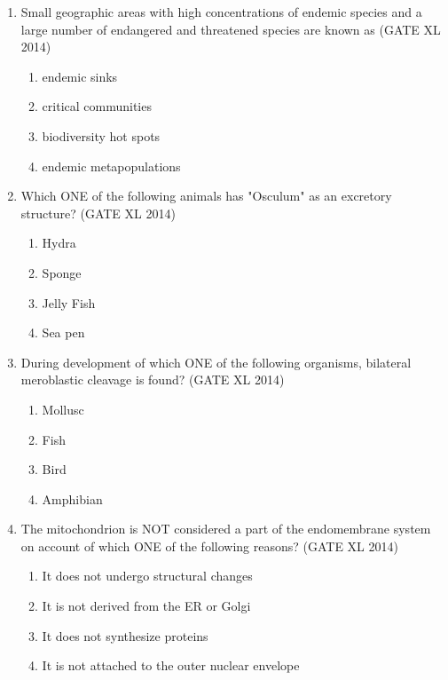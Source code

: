 \documentclass[journal,12pt,onecolumn]{IEEEtran}
\theoremstyle{remark}
\begin{document}
\begin{enumerate}

\item Small geographic areas with high concentrations of endemic species and a large number of endangered and threatened species are known as \hfill(GATE XL 2014)\\
\begin{multicols}{2}
\begin{enumerate}
\item endemic sinks
\item critical communities
\item biodiversity hot spots
\item endemic metapopulations
\end{enumerate}
\end{multicols}

\item Which ONE of the following animals has "Osculum" as an excretory structure? \hfill(GATE XL 2014)\\
\begin{multicols}{2}
\begin{enumerate}
\item Hydra
\item Sponge
\item Jelly Fish
\item Sea pen
\end{enumerate}
\end{multicols}

\item During development of which ONE of the following organisms, bilateral meroblastic cleavage is found? \hfill(GATE XL 2014)\\
\begin{multicols}{2}
\begin{enumerate}
\item Mollusc
\item Fish
\item Bird
\item Amphibian
\end{enumerate}
\end{multicols}

\item The mitochondrion is NOT considered a part of the endomembrane system on account of which ONE of the following reasons? \hfill(GATE XL 2014)\\
\begin{multicols}{2}
\begin{enumerate}
\item It does not undergo structural changes
\item It is not derived from the ER or Golgi
\item It does not synthesize proteins
\item It is not attached to the outer nuclear envelope
\end{enumerate}
\end{multicols}


\end{enumerate}
\end{document}
